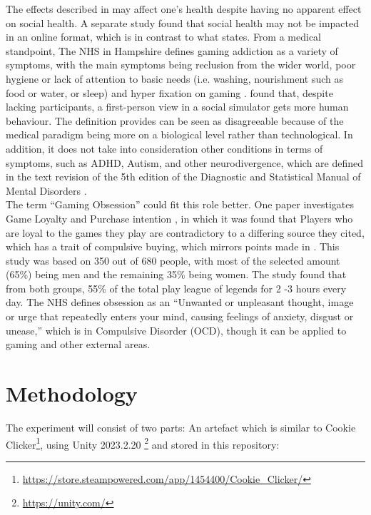\documentclass[conference]{IEEEtran}
\begin{document}
The effects described in \cite{Rahman2021} may affect one’s health despite having no apparent effect on social health. A separate study \cite{Schlagowski2024} found that social health may not be impacted in an online format, which is in contrast to what \cite{NHSHamp24} states. From a medical standpoint, The NHS in Hampshire defines gaming addiction as a variety of symptoms, with the main symptoms being reclusion from the wider world, poor hygiene or lack of attention to basic needs (i.e. washing, nourishment such as food or water, or sleep) and hyper fixation on gaming \cite{NHSHamp24}. \cite{Schlagowski2024} found that, despite lacking participants, a first-person view in a social simulator gets more human behaviour. The definition \cite{NHSHamp24} provides can be seen as disagreeable because of the medical paradigm being more on a biological level rather than technological. In addition, it does not take into consideration other conditions in terms of symptoms, such as ADHD, Autism, and other neurodivergence, which are defined in the text revision of the 5th edition of the Diagnostic and Statistical Manual of Mental Disorders \cite{Association2022}.\\

The term “Gaming Obsession” could fit this role better. One paper investigates Game Loyalty and Purchase intention \cite{Ramli2022}, in which it was found that Players who are loyal to the games they play are contradictory to a differing source they cited\cite{Widodo2020}, which has a trait of compulsive buying, which mirrors points made in \cite{yasir2021}. This study was based on 350 out of 680 people, with most of the selected amount (65\%) being men and the remaining 35\% being women. The study found that from both groups, 55\% of the total play league of legends \cite{Games2009} for 2 -3 hours every day. The NHS \cite{NHS2021} defines obsession as an “Unwanted or unpleasant thought, image or urge that repeatedly enters your mind, causing feelings of anxiety, disgust or unease,” which is in Compulsive Disorder (OCD), though it can be applied to gaming and other external areas.\\

\section{Methodology}
 The experiment will consist of two parts: An artefact which is similar to Cookie Clicker\footnote{\url{https://store.steampowered.com/app/1454400/Cookie_Clicker/}}, using Unity 2023.2.20  \footnote{\url{https://unity.com/}} and stored in this repository:\\
\end{document}
